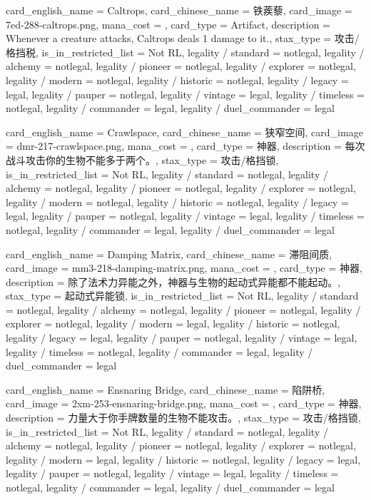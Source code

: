 \documentclass[lang = cn, color = black, 10pt]{AllThatStax}
\begin{document}
\card
{
	card_english_name = {Caltrops},
	card_chinese_name = {铁蒺藜},
	card_image = 7ed-288-caltrops.png,
	mana_cost = ,
	card_type = Artifact,
	description = {Whenever a creature attacks, Caltrops deals 1 damage to it.},
	stax_type = 攻击/格挡税,
	is_in_restricted_list = Not RL,
	legality / standard = notlegal,
	legality / alchemy = notlegal,
	legality / pioneer = notlegal,
	legality / explorer = notlegal,
	legality / modern = notlegal,
	legality / historic = notlegal,
	legality / legacy = legal,
	legality / pauper = notlegal,
	legality / vintage = legal,
	legality / timeless = notlegal,
	legality / commander = legal,
	legality / duel_commander = legal
}

\card
{
	card_english_name = {Crawlspace},
	card_chinese_name = {狭窄空间},
	card_image = dmr-217-crawlspace.png,
	mana_cost = ,
	card_type = 神器,
	description = {每次战斗攻击你的生物不能多于两个。},
	stax_type = 攻击/格挡锁,
	is_in_restricted_list = Not RL,
	legality / standard = notlegal,
	legality / alchemy = notlegal,
	legality / pioneer = notlegal,
	legality / explorer = notlegal,
	legality / modern = notlegal,
	legality / historic = notlegal,
	legality / legacy = legal,
	legality / pauper = notlegal,
	legality / vintage = legal,
	legality / timeless = notlegal,
	legality / commander = legal,
	legality / duel_commander = legal
}

\card
{
	card_english_name = {Damping Matrix},
	card_chinese_name = {滞阻间质},
	card_image = mm3-218-damping-matrix.png,
	mana_cost = ,
	card_type = 神器,
	description = {除了法术力异能之外，神器与生物的起动式异能都不能起动。},
	stax_type = 起动式异能锁,
	is_in_restricted_list = Not RL,
	legality / standard = notlegal,
	legality / alchemy = notlegal,
	legality / pioneer = notlegal,
	legality / explorer = notlegal,
	legality / modern = legal,
	legality / historic = notlegal,
	legality / legacy = legal,
	legality / pauper = notlegal,
	legality / vintage = legal,
	legality / timeless = notlegal,
	legality / commander = legal,
	legality / duel_commander = legal
}

\card
{
	card_english_name = {Ensnaring Bridge},
	card_chinese_name = {陷阱桥},
	card_image = 2xm-253-ensnaring-bridge.png,
	mana_cost = ,
	card_type = 神器,
	description = {力量大于你手牌数量的生物不能攻击。},
	stax_type = 攻击/格挡锁,
	is_in_restricted_list = Not RL,
	legality / standard = notlegal,
	legality / alchemy = notlegal,
	legality / pioneer = notlegal,
	legality / explorer = notlegal,
	legality / modern = legal,
	legality / historic = notlegal,
	legality / legacy = legal,
	legality / pauper = notlegal,
	legality / vintage = legal,
	legality / timeless = notlegal,
	legality / commander = legal,
	legality / duel_commander = legal
}
\end{document}
